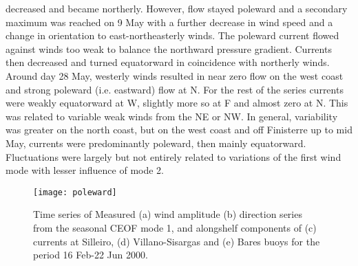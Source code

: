 decreased and became northerly. However, flow stayed poleward and
a secondary maximum was reached on 9 May with a further decrease
in wind speed and a change in orientation to east-northeasterly
winds. The poleward current flowed against winds too weak to
balance the northward pressure gradient. Currents then decreased
and turned equatorward in coincidence with northerly winds. Around
day 28 May, westerly winds resulted in near zero flow on the west
coast and strong poleward (i.e. eastward) flow at N. For the rest
of the series currents were weakly equatorward at W, slightly more
so at F and almost zero at N. This was related to variable weak
winds from the NE or NW. In general, variability was greater on
the north coast, but on the west coast and off Finisterre up to
mid May, currents were predominantly poleward, then mainly
equatorward. Fluctuations were largely but not entirely related to
variations of the first wind mode with lesser influence of mode 2.
\begin{figure}
\texttt{[image: poleward]}
\caption{Time series of Measured (a) wind amplitude (b) direction
series from the seasonal CEOF mode 1, and alongshelf components of
(c) currents at Silleiro, (d) Villano-Sisargas and (e) Bares buoys
for the period 16 Feb-22 Jun 2000.} \label{fig:tswinter}
\end{figure}




